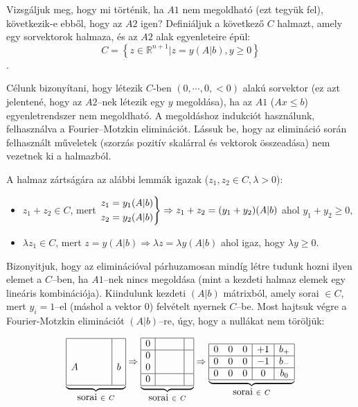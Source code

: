 Vizsgáljuk meg, hogy mi történik, ha $A1$ nem megoldható (ezt tegyük fel),
következik-e ebből, hogy az $A2$ igen? Definiáljuk a következő $C$ halmazt,
amely egy sorvektorok halmaza, és az $A2$ alak egyenleteire épül: \[ C= \left\{
z \in \mathbb{R}^{n+1} | z = y (A|b), y \geq 0 \right\}\].

Célunk bizonyítani, hogy létezik $C$-ben $(0, \cdots, 0 , <0)$ alakú sorvektor
(ez azt jelentené, hogy az $A2$--nek létezik egy $y$ megoldása), ha az $A1$
($Ax \leq b$) egyenletrendszer nem megoldható. A megoldáshoz indukciót
használunk, felhasználva a Fourier--Motzkin eliminációt. Lássuk be, hogy az
elimináció során felhasznált műveletek (szorzás pozitív skalárral és vektorok
összeadása) nem vezetnek ki a halmazból.

A halmaz zártságára az alábbi lemmák igazak ($z_1, z_2 \in C, \lambda>0$):

\begin{itemize}
  \item $z_1+z_2 \in C$, mert $\begin{rcases}
  z_1=y_1(A|b) \\
  z_2=y_2(A|b) \end{rcases} \Rightarrow z_1+z_2=(y_1+y_2)(A|b)$ ahol $y_1+y_2 \geq 0,$
  \item $\lambda z_1 \in C$, mert $
  z=y(A|b) \Rightarrow \lambda z = \lambda y (A|b)$ ahol igaz, hogy $\lambda y \geq 0$.
\end{itemize}

Bizonyitjuk, hogy az eliminációval párhuzamosan mindíg létre tudunk hozni ilyen
elemet a $C$--ben, ha $A1$--nek nincs megoldása (mint a kezdeti halmaz elemek
egy lineáris kombinációja). Kiindulunk kezdeti $(A|b)$ mátrixból, amely sorai
$\in C$, mert $y_i=1$--el (máshol a vektor $0$) felvételt nyernek $C$--be. Most
hajtsuk végre a Fourier-Motzkin eliminációt $(A|b)$--re, úgy, hogy a nullákat
nem töröljük:

\begin{displaymath}
\underbrace{
\begin{array}{|cccc|c|}
\hline
 &  &  &  & \\
 &  & &  & \\
A &  & &  &b \\
 &  & & &\\
\hline
\end{array}}_{\mbox{sorai } \in~C}
\Rightarrow
\underbrace{
\begin{array}{|c|ccc|c|}
\hline
0 &  &  &  & \\
\hline
0 &  & &  & \\
0 &  & &  & \\
\hline
0 &  & & &\\
\hline
\end{array}}_{\mbox{sorai } \in~C}
\Rightarrow
\underbrace{
\begin{array}{|ccc|c|c|}
\hline
0 &  0 &0  & +1  & b_+\\
\hline
0 &  0& 0&  -1& b_-\\
\hline
0 &  0& 0& 0& b_0\\
\hline
\end{array}}_{\mbox{sorai } \in~C}
\end{displaymath}

